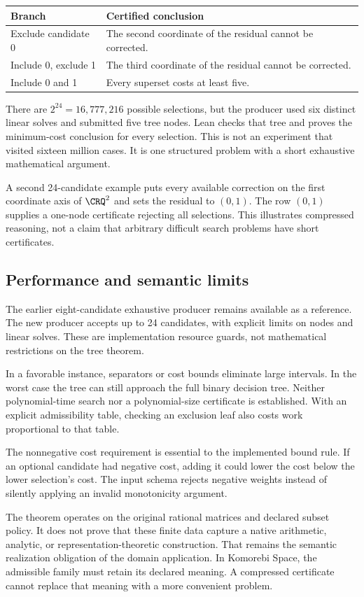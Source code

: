 \begin{center}
\begin{tabularx}{\linewidth}{@{}lX@{}}
\toprule Branch & Certified conclusion\\\midrule
Exclude candidate 0 & The second coordinate of the residual cannot be corrected.\\
Include 0, exclude 1 & The third coordinate of the residual cannot be corrected.\\
Include 0 and 1 & Every superset costs at least five.\\
\bottomrule
\end{tabularx}
\end{center}

There are $2^{24}=16{,}777{,}216$ possible selections, but the producer used six distinct linear solves and submitted five tree nodes. Lean checks that tree and proves the minimum-cost conclusion for every selection. This is not an experiment that visited sixteen million cases. It is one structured problem with a short exhaustive mathematical argument.

A second 24-candidate example puts every available correction on the first coordinate axis of $\CRQ^2$ and sets the residual to $(0,1)$. The row $(0,1)$ supplies a one-node certificate rejecting all selections. This illustrates compressed reasoning, not a claim that arbitrary difficult search problems have short certificates.

\subsection{Performance and semantic limits}

The earlier eight-candidate exhaustive producer remains available as a reference. The new producer accepts up to 24 candidates, with explicit limits on nodes and linear solves. These are implementation resource guards, not mathematical restrictions on the tree theorem.

In a favorable instance, separators or cost bounds eliminate large intervals. In the worst case the tree can still approach the full binary decision tree. Neither polynomial-time search nor a polynomial-size certificate is established. With an explicit admissibility table, checking an exclusion leaf also costs work proportional to that table.

The nonnegative cost requirement is essential to the implemented bound rule. If an optional candidate had negative cost, adding it could lower the cost below the lower selection's cost. The input schema rejects negative weights instead of silently applying an invalid monotonicity argument.

The theorem operates on the original rational matrices and declared subset policy. It does not prove that these finite data capture a native arithmetic, analytic, or representation-theoretic construction. That remains the semantic realization obligation of the domain application. In Komorebi Space, the admissible family must retain its declared meaning. A compressed certificate cannot replace that meaning with a more convenient problem.

